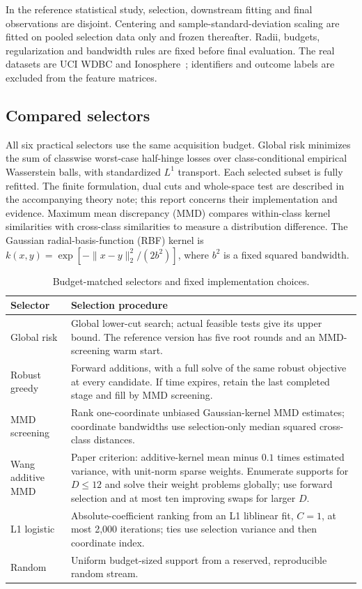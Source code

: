 \documentclass[11pt,a4paper]{article}
\begin{document}
In the reference statistical study, selection, downstream fitting and final observations are disjoint. Centering and
sample-standard-deviation scaling are fitted on pooled selection data only and
frozen thereafter. Radii, budgets, regularization and bandwidth rules are fixed
before final evaluation. The real datasets are UCI WDBC and Ionosphere~\cite{wdbc,ionosphere};
identifiers and outcome labels are excluded from the feature matrices.

\subsection{Compared selectors}
All six practical selectors use the same acquisition budget. Global risk minimizes
the sum of classwise worst-case half-hinge losses over class-conditional empirical
Wasserstein balls, with standardized $L^1$ transport. Each selected subset is fully
refitted. The finite formulation, dual cuts and whole-space test are described in
the accompanying theory note; this report concerns their implementation and evidence.
Maximum mean discrepancy (MMD) compares within-class kernel similarities with
cross-class similarities to measure a distribution difference. The Gaussian
radial-basis-function (RBF) kernel is
$k(x,y)=\exp[-\|x-y\|_2^2/(2b^2)]$, where $b^2$ is a fixed squared bandwidth.
\begin{table}[htbp]\centering\small
\caption{Budget-matched selectors and fixed implementation choices.}\label{tab:selectors}
\begin{tabularx}{\linewidth}{@{}p{26mm}Y@{}}\toprule
Selector & Selection procedure\\\midrule
Global risk & Global lower-cut search; actual feasible tests give its upper bound. The reference version has five root rounds and an MMD-screening warm start.\\
Robust greedy & Forward additions, with a full solve of the same robust objective at every candidate. If time expires, retain the last completed stage and fill by MMD screening.\\
MMD screening & Rank one-coordinate unbiased Gaussian-kernel MMD estimates; coordinate bandwidths use selection-only median squared cross-class distances.\\
Wang additive MMD & Paper criterion: additive-kernel mean minus $0.1$ times estimated variance, with unit-norm sparse weights. Enumerate supports for $D\le12$ and solve their weight problems globally; use forward selection and at most ten improving swaps for larger $D$.\\
L1 logistic & Absolute-coefficient ranking from an L1 liblinear fit, $C=1$, at most 2,000 iterations; ties use selection variance and then coordinate index.\\
Random & Uniform budget-sized support from a reserved, reproducible random stream.\\\bottomrule
\end{tabularx}\end{table}
\end{document}
